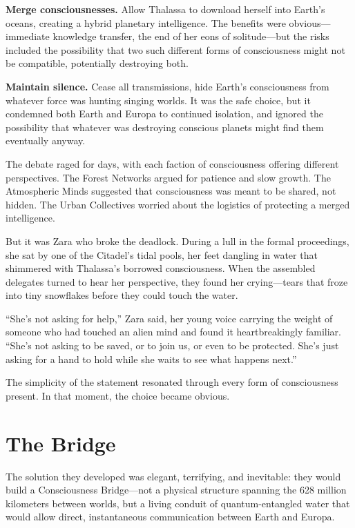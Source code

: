 \textbf{Merge consciousnesses.} Allow Thalassa to download herself into Earth's oceans, creating a hybrid planetary intelligence. The benefits were obvious—immediate knowledge transfer, the end of her eons of solitude—but the risks included the possibility that two such different forms of consciousness might not be compatible, potentially destroying both.

\textbf{Maintain silence.} Cease all transmissions, hide Earth's consciousness from whatever force was hunting singing worlds. It was the safe choice, but it condemned both Earth and Europa to continued isolation, and ignored the possibility that whatever was destroying conscious planets might find them eventually anyway.

The debate raged for days, with each faction of consciousness offering different perspectives. The Forest Networks argued for patience and slow growth. The Atmospheric Minds suggested that consciousness was meant to be shared, not hidden. The Urban Collectives worried about the logistics of protecting a merged intelligence.

But it was Zara who broke the deadlock. During a lull in the formal proceedings, she sat by one of the Citadel's tidal pools, her feet dangling in water that shimmered with Thalassa's borrowed consciousness. When the assembled delegates turned to hear her perspective, they found her crying—tears that froze into tiny snowflakes before they could touch the water.

``She's not asking for help,'' Zara said, her young voice carrying the weight of someone who had touched an alien mind and found it heartbreakingly familiar. ``She's not asking to be saved, or to join us, or even to be protected. She's just asking for a hand to hold while she waits to see what happens next.''

The simplicity of the statement resonated through every form of consciousness present. In that moment, the choice became obvious.

\section{The Bridge}

The solution they developed was elegant, terrifying, and inevitable: they would build a Consciousness Bridge—not a physical structure spanning the 628 million kilometers between worlds, but a living conduit of quantum-entangled water that would allow direct, instantaneous communication between Earth and Europa.

